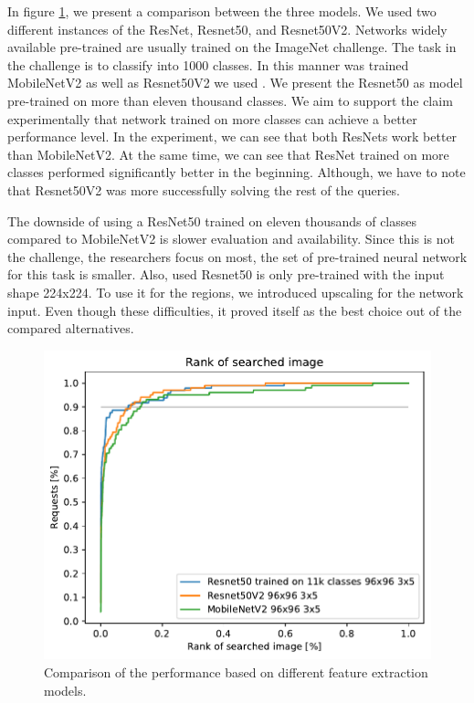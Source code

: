 In figure \ref{fig:networks}, we present a comparison between the three models. We used two different instances of the ResNet, Resnet50, and Resnet50V2. Networks widely available pre-trained are usually trained on the ImageNet challenge. The task in the challenge is to classify into 1000 classes. In this manner was trained MobileNetV2 as well as Resnet50V2 we used . We present the Resnet50 as model pre-trained on more than eleven thousand classes. We aim to support the claim experimentally that network trained on more classes can achieve a better performance level.  In the experiment, we can see that both ResNets work better than MobileNetV2. At the same time, we can see that ResNet trained on more classes performed significantly better in the beginning. Although, we have to note that Resnet50V2 was more successfully solving the rest of the queries.

The downside of using a ResNet50 trained on eleven thousands of classes compared to MobileNetV2 is slower evaluation and availability. Since this is not the challenge, the researchers focus on most, the set of pre-trained neural network for this task is smaller. Also,  used Resnet50 is only pre-trained with the input shape 224x224. To use it for the regions, we introduced upscaling for the network input. Even though  these difficulties, it proved itself as the best choice out of the compared alternatives.

\begin{figure}
    \centering
    \includegraphics[width=0.8\linewidth]{graphs/2536f6c96149dea24dae84dbf52f760d7d58b0dffa7d660656e1784d9dca277f.pdf}
    \caption{Comparison of the performance based on different feature extraction models.}
    \label{fig:networks}
\end{figure}

